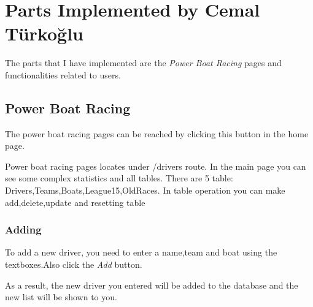 \documentclass[a4paper,10pt,english]{sphinxmanual}
\begin{document}
\section{Parts Implemented by Cemal Türkoğlu}
\label{user/member2::doc}\label{user/member2:parts-implemented-by-cemal-turkoglu}
The parts that I have implemented are the \emph{Power Boat Racing} pages and functionalities related to users.


\subsection{Power Boat Racing}
\label{user/member2:power-boat-racing}
The power boat racing pages can be reached by clicking this button in the home page.
\begin{quote}

\end{quote}

Power boat racing pages locates under /drivers route. In the main page you can see some complex statistics
and all tables. There are 5 table: Drivers,Teams,Boats,League15,OldRaces. In table operation you can make
add,delete,update and resetting table


\subsubsection{Adding}
\label{user/member2:adding}
To add a new driver, you need to enter a name,team and boat using the textboxes.Also click the \emph{Add} button.
\begin{quote}

\end{quote}

As a result, the new driver you entered will be added to the database and the new list will be shown to you.
\end{document}
